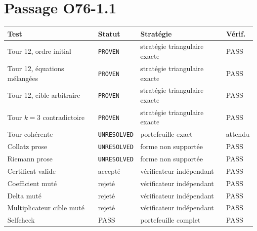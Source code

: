 \documentclass[11pt,a4paper]{article}
\newcommand{\Proven}{\texttt{PROVEN}}
\newcommand{\Unresolved}{\texttt{UNRESOLVED}}
\begin{document}
\section{Passage O76-1.1}
\begin{longtable}{p{}p{}p{}p{}}
\toprule
Test & Statut & Stratégie & Vérif.\\
\midrule
Tour 12, ordre initial & \Proven{} & stratégie triangulaire exacte & PASS\\
Tour 12, équations mélangées & \Proven{} & stratégie triangulaire exacte & PASS\\
Tour 12, cible arbitraire & \Proven{} & stratégie triangulaire exacte & PASS\\
Tour $k=3$ contradictoire & \Proven{} & stratégie triangulaire exacte & PASS\\
Tour cohérente & \Unresolved{} & portefeuille exact & attendu\\
Collatz prose & \Unresolved{} & forme non supportée & PASS\\
Riemann prose & \Unresolved{} & forme non supportée & PASS\\
Certificat valide & accepté & vérificateur indépendant & PASS\\
Coefficient muté & rejeté & vérificateur indépendant & PASS\\
Delta muté & rejeté & vérificateur indépendant & PASS\\
Multiplicateur cible muté & rejeté & vérificateur indépendant & PASS\\
Selfcheck & PASS & portefeuille complet & PASS\\
\bottomrule\end{longtable}
\end{document}
